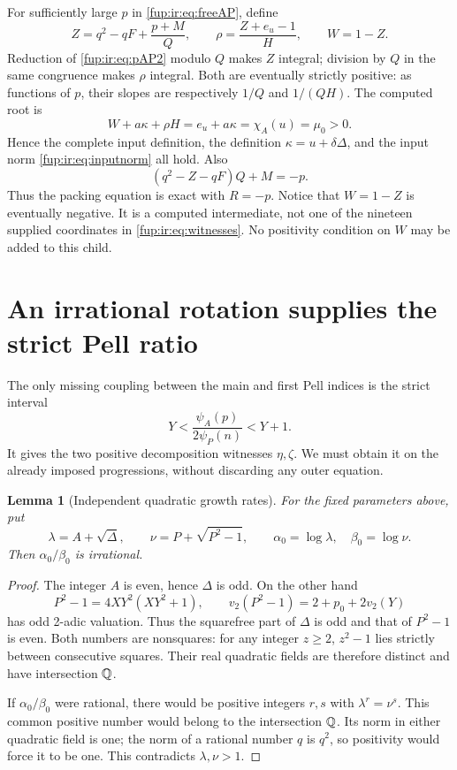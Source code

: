\documentclass[11pt,letterpaper]{article}
\newtheorem{lemma}[theorem]{Lemma}
\theoremstyle{definition}\newtheorem{definition}[theorem]{Definition}
\theoremstyle{remark}\newtheorem{remark}[theorem]{Remark}
\begin{document}
For sufficiently large $p$ in \eqref{fup:ir:eq:freeAP}, define
\begin{equation}\label{fup:ir:eq:Zrho}
 Z=q^2-qF+\frac{p+M}{Q},\qquad
 \rho=\frac{Z+e_u-1}{H},\qquad W=1-Z.
\end{equation}
Reduction of \eqref{fup:ir:eq:pAP2} modulo $Q$ makes $Z$ integral; division by $Q$ in the same congruence makes $\rho$ integral. Both are eventually strictly positive: as functions of $p$, their slopes are respectively $1/Q$ and $1/(QH)$. The computed root is
\begin{equation}\label{fup:ir:eq:mupositivity}
 W+a\kappa+\rho H=e_u+a\kappa=\chi_A(u)=\mu_0>0.
\end{equation}
Hence the complete input definition, the definition $\kappa=u+\delta\Delta$, and the input norm \eqref{fup:ir:eq:inputnorm} all hold. Also
\begin{equation}\label{fup:ir:eq:packingnegative}
 (q^2-Z-qF)Q+M=-p.
\end{equation}
Thus the packing equation is exact with $R=-p$. Notice that $W=1-Z$ is eventually negative. It is a computed intermediate, not one of the nineteen supplied coordinates in \eqref{fup:ir:eq:witnesses}. No positivity condition on $W$ may be added to this child.

\section{An irrational rotation supplies the strict Pell ratio}\label{fup:ir:sec:density}
The only missing coupling between the main and first Pell indices is the strict interval
\begin{equation}\label{fup:ir:eq:ratio}
 Y<\frac{\psi_A(p)}{2\psi_P(n)}<Y+1.
\end{equation}
It gives the two positive decomposition witnesses $\eta,\zeta$. We must obtain it on the already imposed progressions, without discarding any outer equation.

\begin{lemma}[Independent quadratic growth rates]\label{fup:ir:lem:irrational}
For the fixed parameters above, put
\[
 \lambda=A+\sqrt{\Delta},\qquad
 \nu=P+\sqrt{P^2-1},\qquad
 \alpha_0=\log\lambda,\quad\beta_0=\log\nu.
\]
Then $\alpha_0/\beta_0$ is irrational.
\end{lemma}
\begin{proof}
The integer $A$ is even, hence $\Delta$ is odd. On the other hand
\[
 P^2-1=4XY^2(XY^2+1),\qquad
 v_2(P^2-1)=2+p_0+2v_2(Y)
\]
has odd 2-adic valuation. Thus the squarefree part of $\Delta$ is odd and that of $P^2-1$ is even. Both numbers are nonsquares: for any integer $z\ge2$, $z^2-1$ lies strictly between consecutive squares. Their real quadratic fields are therefore distinct and have intersection $\mathbb Q$.

If $\alpha_0/\beta_0$ were rational, there would be positive integers $r,s$ with $\lambda^r=\nu^s$. This common positive number would belong to the intersection $\mathbb Q$. Its norm in either quadratic field is one; the norm of a rational number $q$ is $q^2$, so positivity would force it to be one. This contradicts $\lambda,\nu>1$.
\end{proof}
\end{document}
